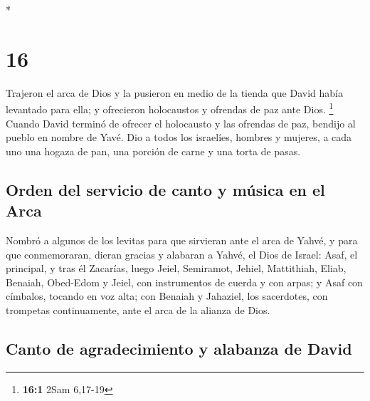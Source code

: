 \begin{paracol}{2}
\begin{otherlanguage}{english}
\end{otherlanguage}

\switchcolumn[0]*

\hypertarget{section-30}{%
\section{16}\label{section-30}}

 Trajeron el arca de Dios y la pusieron en medio de la
tienda que David había levantado para ella; y ofrecieron holocaustos y
ofrendas de paz ante Dios. \footnote{\textbf{16:1} 2Sam 6,17-19}
 Cuando David terminó de ofrecer el holocausto y las
ofrendas de paz, bendijo al pueblo en nombre de Yavé.  Dio
a todos los israelíes, hombres y mujeres, a cada uno una hogaza de pan,
una porción de carne y una torta de pasas.

\hypertarget{orden-del-servicio-de-canto-y-muxfasica-en-el-arca}{%
\subsection{Orden del servicio de canto y música en el
Arca}\label{orden-del-servicio-de-canto-y-muxfasica-en-el-arca}}

 Nombró a algunos de los levitas para que sirvieran ante
el arca de Yahvé, y para que conmemoraran, dieran gracias y alabaran a
Yahvé, el Dios de Israel:  Asaf, el principal, y tras él
Zacarías, luego Jeiel, Semiramot, Jehiel, Mattithiah, Eliab, Benaiah,
Obed-Edom y Jeiel, con instrumentos de cuerda y con arpas; y Asaf con
címbalos, tocando en voz alta;  con Benaiah y Jahaziel,
los sacerdotes, con trompetas continuamente, ante el arca de la alianza
de Dios.

\hypertarget{canto-de-agradecimiento-y-alabanza-de-david}{%
\subsection{Canto de agradecimiento y alabanza de
David}\label{canto-de-agradecimiento-y-alabanza-de-david}}


\end{paracol}
